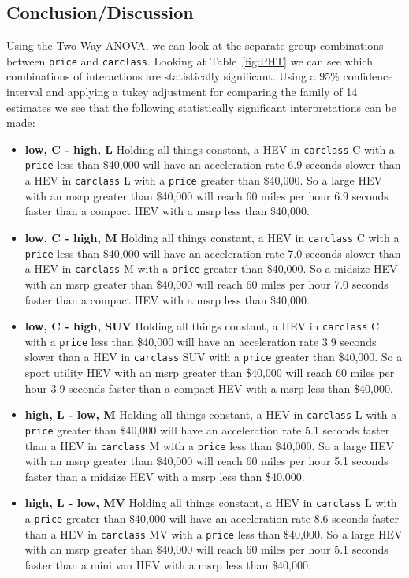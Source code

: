 \documentclass[acmsmall]{acmart}
\begin{document}
\subsection{Conclusion/Discussion}
Using the Two-Way ANOVA, we can look at the separate group combinations between \texttt{price} and \texttt{carclass}. Looking at Table~\ref{fig:PHT} we can see which combinations of interactions are statistically significant. Using a 95\% confidence interval and applying a tukey adjustment for comparing the family of 14 estimates we see that the following statistically significant interpretations can be made:\\
\begin{itemize}
\item[] \textbf{low, C - high, L} Holding all things constant, a HEV in \texttt{carclass} C with a \texttt{price} less than \$40,000 will have an acceleration rate 6.9 seconds slower than a HEV in \texttt{carclass} L with a \texttt{price} greater than \$40,000. So a large HEV with an msrp greater than \$40,000 will reach 60 miles per hour 6.9 seconds faster than a compact HEV with a msrp less than \$40,000.
\item[] \textbf{low, C - high, M} Holding all things constant, a HEV in \texttt{carclass} C with a \texttt{price} less than \$40,000 will have an acceleration rate 7.0 seconds slower than a HEV in \texttt{carclass} M with a \texttt{price} greater than \$40,000. So a midsize HEV with an msrp greater than \$40,000 will reach 60 miles per hour 7.0 seconds faster than a compact HEV with a msrp less than \$40,000.
\item[] \textbf{low, C - high, SUV} Holding all things constant, a HEV in \texttt{carclass} C with a \texttt{price} less than \$40,000 will have an acceleration rate 3.9 seconds slower than a HEV in \texttt{carclass} SUV with a \texttt{price} greater than \$40,000. So a sport utility HEV with an msrp greater than \$40,000 will reach 60 miles per hour 3.9 seconds faster than a compact HEV with a msrp less than \$40,000.
\item[] \textbf{high, L - low, M} Holding all things constant, a HEV in \texttt{carclass} L with a \texttt{price} greater than \$40,000 will have an acceleration rate 5.1 seconds faster than a HEV in \texttt{carclass} M with a \texttt{price} less than \$40,000. So a large HEV with an msrp greater than \$40,000 will reach 60 miles per hour 5.1 seconds faster than a midsize HEV with a msrp less than \$40,000.
\item[] \textbf{high, L - low, MV} Holding all things constant, a HEV in \texttt{carclass} L with a \texttt{price} greater than \$40,000 will have an acceleration rate 8.6 seconds faster than a HEV in \texttt{carclass} MV with a \texttt{price} less than \$40,000. So a large HEV with an msrp greater than \$40,000 will reach 60 miles per hour 5.1 seconds faster than a mini van HEV with a msrp less than \$40,000.

\end{itemize}
\end{document}
